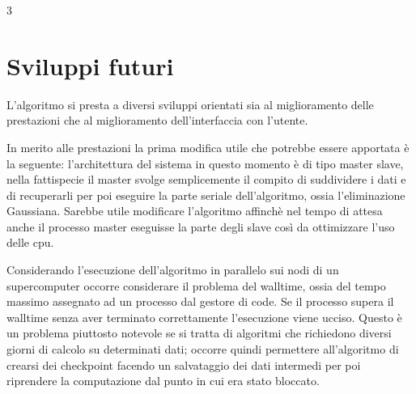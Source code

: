 3%
\section{Sviluppi futuri}
\label{sec:sviluppi}


L'algoritmo si presta a diversi sviluppi orientati sia al miglioramento delle prestazioni che al miglioramento dell'interfaccia
con l'utente.

In merito alle prestazioni la prima modifica utile che potrebbe essere apportata è la seguente:
l'architettura del sistema in questo momento è di tipo master slave, nella fattispecie il master svolge semplicemente il compito di suddividere  
i dati e di recuperarli per poi eseguire la parte seriale dell'algoritmo, ossia l'eliminazione Gaussiana.
Sarebbe utile modificare l'algoritmo affinchè nel tempo di attesa anche il processo master eseguisse la parte degli slave così da ottimizzare
l'uso delle cpu.

Considerando l'esecuzione dell'algoritmo in parallelo sui nodi di un supercomputer occorre considerare il problema del walltime, ossia
del tempo massimo assegnato ad un processo dal gestore di code.
Se il processo supera il walltime senza aver terminato correttamente l'esecuzione viene ucciso.
Questo è un problema piuttosto notevole se si tratta di algoritmi che richiedono diversi giorni di calcolo su determinati dati; occorre quindi
permettere all'algoritmo di crearsi dei checkpoint facendo un salvataggio dei dati intermedi per poi riprendere la computazione dal punto in 
cui era stato bloccato.